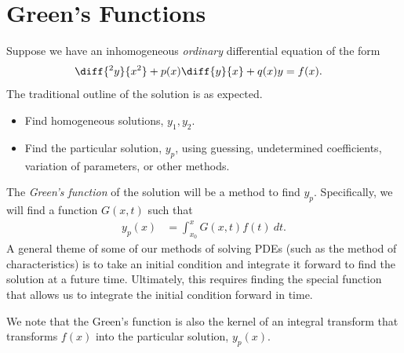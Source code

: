 \documentclass[10pt]{mypackage}
\begin{document}
\section{Green's Functions}%
Suppose we have an inhomogeneous \textit{ordinary} differential equation of the form
\begin{align*}
  \diff{^2y}{x^2} + p(x)\diff{y}{x} + q(x)y &= f(x).
\end{align*}
The traditional outline of the solution is as expected.
\begin{itemize}
  \item Find homogeneous solutions, $y_1,y_2$.
  \item Find the particular solution, $y_p$, using guessing, undetermined coefficients, variation of parameters, or other methods.
\end{itemize}
The \textit{Green's function} of the solution will be a method to find $y_p$. Specifically, we will find a function $G\left( x,t \right)$ such that
\begin{align*}
  y_p(x) &= \int_{x_0}^{x} G(x,t)f(t)\:dt.
\end{align*}
A general theme of some of our methods of solving PDEs (such as the method of characteristics) is to take an initial condition and integrate it forward to find the solution at a future time. Ultimately, this requires finding the special function that allows us to integrate the initial condition forward in time.\newline

We note that the Green's function is also the kernel of an integral transform that transforms $f(x)$ into the particular solution, $y_p(x)$.\newline
\end{document}
